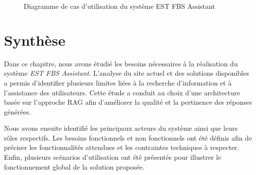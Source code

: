 \documentclass[12pt, a4paper, twoside]{report}
\begin{document}
\begin{figure}[H]
\centering

\newline
\caption{Diagramme de cas d’utilisation du système EST FBS Assistant}
\label{fig:usecase}
\end{figure}

\newpage
\section{Synthèse}

Dans ce chapitre, nous avons étudié les besoins nécessaires à la réalisation du système \textit{EST FBS Assistant}. L’analyse du site actuel et des solutions disponibles a permis d’identifier plusieurs limites liées à la recherche d’information et à l’assistance des utilisateurs. Cette étude a conduit au choix d’une architecture basée sur l’approche RAG afin d’améliorer la qualité et la pertinence des réponses générées.

Nous avons ensuite identifié les principaux acteurs du système ainsi que leurs rôles respectifs. Les besoins fonctionnels et non fonctionnels ont été définis afin de préciser les fonctionnalités attendues et les contraintes techniques à respecter. Enfin, plusieurs scénarios d’utilisation ont été présentés pour illustrer le fonctionnement global de la solution proposée.
\end{document}
